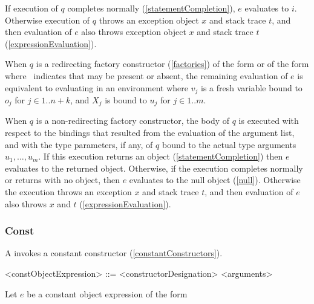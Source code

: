 \documentclass[makeidx]{article}
\begin{document}
{\LMHash{}%
If execution of $q$ completes normally (\ref{statementCompletion}),
$e$ evaluates to $i$.
Otherwise execution of $q$ throws an exception object $x$ and stack trace $t$,
and then evaluation of $e$ also throws exception object $x$ and stack trace $t$
(\ref{expressionEvaluation}).
\EndCase

\LMHash{}%
When $q$ is a redirecting factory constructor
(\ref{factories})
of the form  or
of the form 
where \ indicates that \CONST{} may be present or absent,
the remaining evaluation of $e$ is equivalent to
evaluating
in an environment where
$v_j$ is a fresh variable bound to $o_j$ for $j \in 1 .. n + k$, and
$X_j$ is bound to $u_j$ for $j \in 1 .. m$.
\EndCase

\LMHash{}%
When $q$ is a non-redirecting factory constructor,
the body of $q$ is executed with respect to
the bindings that resulted from the evaluation of the argument list,
and with the type parameters, if any, of $q$ bound to
the actual type arguments $u_1, \ldots, u_m$.
If this execution returns an object
(\ref{statementCompletion})
then $e$ evaluates to the returned object.
Otherwise, if the execution completes normally or returns with no object,
then $e$ evaluates to the null object (\ref{null}).
Otherwise the execution throws an exception $x$ and stack trace $t$,
and then evaluation of $e$ also throws $x$ and $t$
(\ref{expressionEvaluation}).

\EndCase


\subsubsection{Const}

\LMHash{}%
A  invokes a constant constructor
(\ref{constantConstructors}).

\begin{grammar}
<constObjectExpression> ::= \CONST{} <constructorDesignation> <arguments>
\end{grammar}

\LMHash{}%
Let $e$ be a constant object expression of the form

}
\end{document}
